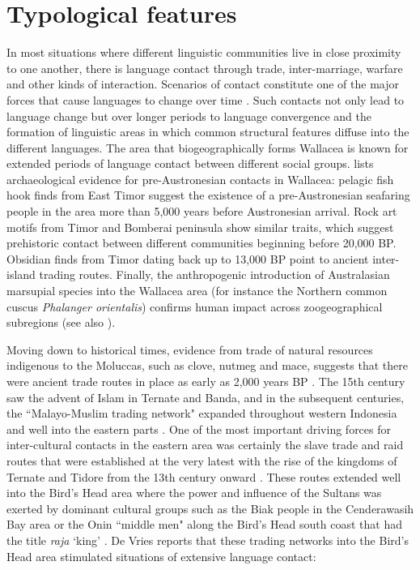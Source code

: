 \section{Typological features}\label{sec:typo}
In most situations where different linguistic communities live in close proximity to one another, there is language contact through trade, inter-marriage, warfare and other kinds of interaction. Scenarios of contact constitute one of the major forces that cause languages to change over time \citep{thomason2001language}. Such contacts not only lead to language change but over longer periods to language convergence and the formation of linguistic areas in which common structural features diffuse into the different languages. The area that biogeographically forms Wallacea is known for extended periods of language contact between different social groups. \citet[141f.]{schapper2015wallacea} lists archaeological evidence for pre-Austronesian contacts in Wallacea: pelagic fish hook finds from East Timor suggest the existence of a pre-Austronesian seafaring people in the area more than 5,000 years before Austronesian arrival. Rock art motifs from Timor and Bomberai peninsula show similar traits, which suggest prehistoric contact between different communities beginning before 20,000 BP. Obsidian finds from Timor dating back up to 13,000 BP point to ancient inter-island trading routes. Finally, the anthropogenic introduction of Australasian marsupial species into the Wallacea area (for instance the Northern common cuscus \textit{Phalanger orientalis}) confirms human impact across zoogeographical subregions (see also \citealt{Heinsohn2010}).

Moving down to historical times, evidence from trade of natural resources indigenous to the Moluccas, such as clove, nutmeg and mace, suggests that there were ancient trade routes in place as early as 2,000 years BP \citep{klamer2008east}. The 15th century saw the advent of Islam in Ternate and Banda, and in the subsequent centuries, the ``Malayo-Muslim trading network" expanded throughout western Indonesia and well into the eastern parts \citep{klamer2008east}. One of the most important driving forces for inter-cultural contacts in the eastern area was certainly the slave trade and raid routes that were established at the very latest with the rise of the kingdoms of Ternate and Tidore from the 13th century onward \citep{klamer2008east}. These routes extended well into the Bird's Head area where the power and influence of the Sultans was exerted by dominant cultural groups such as the Biak people in the Cenderawasih Bay area \citep[2]{vanheuvel2006} or the Onin ``middle men" along the Bird's Head south coast that had the title \textit{raja} `king' \citep[2]{devries2004}. De Vries reports that these trading networks into the Bird's Head area stimulated situations of extensive language contact:

